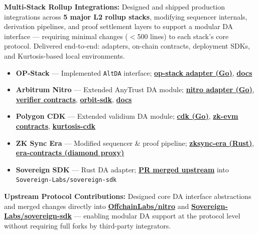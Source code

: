 \documentclass[letterpaper,11pt]{article}
\newcommand{\resumeItem}[1]{
  \item\small{{#1 \vspace{-2pt}}}
}
\begin{document}
    \resumeItem{\textbf{Multi-Stack Rollup Integrations:} Designed and shipped production integrations across \textbf{5 major L2 rollup stacks}, modifying sequencer internals, derivation pipelines, and proof settlement layers to support a modular DA interface — requiring minimal changes ($<$500 lines) to each stack's core protocol. Delivered end-to-end: adapters, on-chain contracts, deployment SDKs, and Kurtosis-based local environments.}
    \begin{itemize}
      \item \textbf{OP-Stack} — Implemented \texttt{AltDA} interface; \href{https://github.com/availproject/avail-op-stack-adapter}{\textbf{op-stack adapter (Go)}}, \href{https://docs.availproject.org/docs/build-with-avail/deploy-rollup-on-avail/Optimium/op-stack/op-stack}{\textbf{docs}}
      \item \textbf{Arbitrum Nitro} — Extended AnyTrust DA module; \href{https://github.com/availproject/avail-nitro-adapter}{\textbf{nitro adapter (Go)}}, \href{https://github.com/availproject/nitro-contracts}{\textbf{verifier contracts}}, \href{https://github.com/availproject/arbitrum-orbit-sdk}{\textbf{orbit-sdk}}, \href{https://docs.availproject.org/docs/build-with-avail/deploy-rollup-on-avail/Optimium/arbitrum-nitro/nitro-stack}{\textbf{docs}}
      \item \textbf{Polygon CDK} — Extended validium DA module; \href{https://github.com/availproject/cdk}{\textbf{cdk (Go)}}, \href{https://github.com/availproject/cdk-zkevm-contracts}{\textbf{zk-evm contracts}}, \href{https://github.com/availproject/kurtosis-cdk}{\textbf{kurtosis-cdk}}
      \item \textbf{ZK Sync Era} — Modified sequencer \& proof pipeline; \href{https://github.com/availproject/zksync-era}{\textbf{zksync-era (Rust)}}, \href{https://github.com/availproject/era-contracts}{\textbf{era-contracts (diamond proxy)}}
      \item \textbf{Sovereign SDK} — Rust DA adapter; \href{https://github.com/Sovereign-Labs/sovereign-sdk/pull/1709}{\textbf{PR merged upstream}} into \texttt{Sovereign-Labs/sovereign-sdk}
    \end{itemize}

    \resumeItem{\textbf{Upstream Protocol Contributions:} Designed core DA interface abstractions and merged changes directly into \href{https://github.com/OffchainLabs/nitro/pull/2666}{\textbf{OffchainLabs/nitro}} and \href{https://github.com/Sovereign-Labs/sovereign-sdk/pull/1709}{\textbf{Sovereign-Labs/sovereign-sdk}} — enabling modular DA support at the protocol level without requiring full forks by third-party integrators.}
\end{document}

